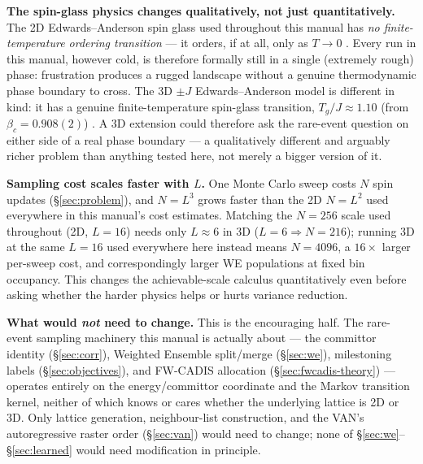 \documentclass[11pt,a4paper]{article}
\begin{document}
\textbf{The spin-glass physics changes qualitatively, not just quantitatively.} The 2D
Edwards--Anderson spin glass used throughout this manual has \emph{no finite-temperature
ordering transition} --- it orders, if at all, only as $T\to0$ \cite{binderyoung1986}. Every run
in this manual, however cold, is therefore formally still in a single (extremely rough) phase:
frustration produces a rugged landscape without a genuine thermodynamic phase boundary to cross.
The 3D $\pm J$ Edwards--Anderson model is different in kind: it has a genuine finite-temperature
spin-glass transition, $T_g/J\approx1.10$ (from $\beta_c=0.908(2)$) \cite{hasenbusch2008}. A 3D
extension could therefore ask the rare-event question on either side of a real phase boundary ---
a qualitatively different and arguably richer problem than anything tested here, not merely a
bigger version of it.

\textbf{Sampling cost scales faster with $L$.} One Monte Carlo sweep costs $N$ spin updates
(\S\ref{sec:problem}), and $N=L^3$ grows faster than the 2D $N=L^2$ used everywhere in this
manual's cost estimates. Matching the $N=256$ scale used throughout (2D, $L=16$) needs only
$L\approx6$ in 3D ($L=6\Rightarrow N=216$); running 3D at the same $L=16$ used everywhere here
instead means $N=4096$, a $16\times$ larger per-sweep cost, and correspondingly larger WE
populations at fixed bin occupancy. This changes the achievable-scale calculus quantitatively
even before asking whether the harder physics helps or hurts variance reduction.

\textbf{What would \emph{not} need to change.} This is the encouraging half. The rare-event
sampling machinery this manual is actually about --- the committor identity
(\S\ref{sec:corr}), Weighted Ensemble split/merge (\S\ref{sec:we}), milestoning labels
(\S\ref{sec:objectives}), and FW-CADIS allocation (\S\ref{sec:fwcadis-theory}) --- operates
entirely on the energy/committor coordinate and the Markov transition kernel, neither of which
knows or cares whether the underlying lattice is 2D or 3D. Only lattice generation, neighbour-list
construction, and the VAN's autoregressive raster order (\S\ref{sec:van}) would need to change;
none of \S\ref{sec:we}--\S\ref{sec:learned} would need modification in principle.
\end{document}
